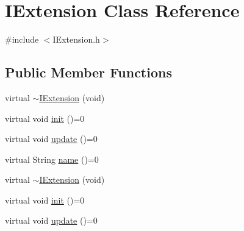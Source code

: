 \hypertarget{class_i_extension}{\section{I\-Extension Class Reference}
\label{class_i_extension}
}


{\ttfamily \#include $<$I\-Extension.\-h$>$}

\subsection*{Public Member Functions}
\begin{DoxyCompactItemize}
\item 
virtual \hyperlink{class_i_extension_ab21f9f9ce921784280b1c1b9d06aebc7}{$\sim$\-I\-Extension} (void)
\item 
virtual void \hyperlink{class_i_extension_ac57a596d0dba102bf9759f296e29f578}{init} ()=0
\item 
virtual void \hyperlink{class_i_extension_a980803148d1d0591d792d1b178b1faff}{update} ()=0
\item 
virtual String \hyperlink{class_i_extension_a3f01b5d96ae37d8fb046eaaae71b63bc}{name} ()=0
\item 
virtual \hyperlink{class_i_extension_ab21f9f9ce921784280b1c1b9d06aebc7}{$\sim$\-I\-Extension} (void)
\item 
virtual void \hyperlink{class_i_extension_ac57a596d0dba102bf9759f296e29f578}{init} ()=0
\item 
virtual void \hyperlink{class_i_extension_a980803148d1d0591d792d1b178b1faff}{update} ()=0
\end{DoxyCompactItemize}



